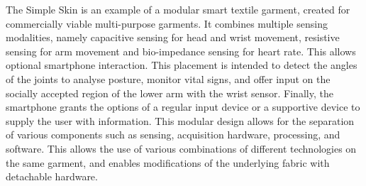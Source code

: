 \documentclass{sigchi}
\begin{document}
The Simple Skin \cite{simpleskin} is an example of a modular smart textile garment, created for commercially viable multi-purpose garments. It combines multiple sensing modalities, namely capacitive sensing for head and wrist movement, resistive sensing for arm movement
and bio-impedance sensing for heart rate. This allows optional smartphone interaction. This placement is intended to detect the angles of the joints to analyse posture, monitor vital signs, and offer input on the socially accepted region of the lower arm with the wrist sensor. Finally, the smartphone grants the options of a regular input device or a supportive device to supply the user with  information. This modular design allows for the separation of various components such as sensing, acquisition hardware, processing, and software. This allows the use of various combinations of different technologies on the same garment, and enables modifications of the underlying fabric with detachable hardware. \cite{simpleskin}
\end{document}
